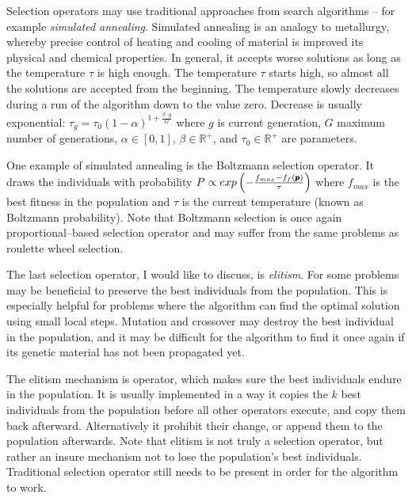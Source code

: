 Selection operators may use traditional approaches from search algorithms -- for example \emph{simulated annealing}. Simulated annealing is an analogy to metallurgy, whereby precise control of heating and cooling of material is improved its physical and chemical properties. In general, it accepts worse solutions as long as the temperature $\tau$ is high enough. The temperature $\tau$ starts high, so almost all the solutions are accepted from the beginning. The temperature slowly decreases during a run of the algorithm down to the value zero. Decrease is usually exponential: $\tau_g=\tau_0(1-\alpha)^{1+\frac{\beta\cdot g}{G}}$ where $g$ is current generation, $G$ maximum number of generations, $\alpha\in\left[0,1\right]$, $\beta\in\mathbb{R}^+$, and $\tau_0\in\mathbb{R}^+$ are parameters. 

One example of simulated annealing is the Boltzmann selection operator. It draws the individuals with probability 
$P\propto exp\left(-\frac{f_{max} - f_f(\pmb{p})}{\tau}\right)$
where $f_{max}$ is the best fitness in the population and $\tau$ is the current temperature (known as Boltzmann probability). Note that Boltzmann selection is once again proportional--based selection operator and may suffer from the same problems as roulette wheel selection.

The last selection operator, I would like to discuss, is \emph{elitism}. For some problems may be beneficial to preserve the best individuals from the population. This is especially helpful for problems where the algorithm can find the optimal solution using small local steps. Mutation and crossover may destroy the best individual in the population, and it may be difficult for the algorithm to find it once again if its genetic material has not been propagated yet.

The elitism mechanism is operator, which makes sure the best individuals endure in the population. It is usually implemented in a way it copies the $k$ best individuals from the population before all other operators execute, and copy them back afterward. Alternatively it prohibit their change, or append them to the population afterwards. Note that elitism is not truly a selection operator, but rather an insure mechanism not to lose the population's best individuals. Traditional selection operator still needs to be present in order for the algorithm to work. 





